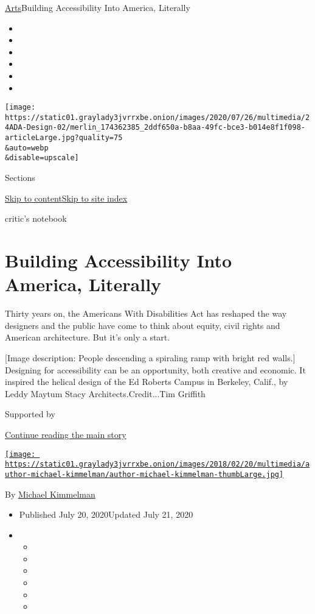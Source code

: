 \href{/section/arts}{Arts}\textbar{}Building Accessibility Into America,
Literally

\begin{itemize}
\item
\item
\item
\item
\item
\item
\end{itemize}

\texttt{[image: https://static01.graylady3jvrrxbe.onion/images/2020/07/26/multimedia/24ADA-Design-02/merlin\_174362385\_2ddf650a-b8aa-49fc-bce3-b014e8f1f098-articleLarge.jpg?quality=75\\\&auto=webp\\\&disable=upscale]}

Sections

\protect\hyperlink{site-content}{Skip to
content}\protect\hyperlink{site-index}{Skip to site index}

critic's notebook

\hypertarget{building-accessibility-into-america-literally}{%
\section{Building Accessibility Into America,
Literally}\label{building-accessibility-into-america-literally}}

Thirty years on, the Americans With Disabilities Act has reshaped the
way designers and the public have come to think about equity, civil
rights and American architecture. But it's only a start.

{[}Image description: People descending a spiraling ramp with bright red
walls.{]} Designing for accessibility can be an opportunity, both
creative and economic. It inspired the helical design of the Ed Roberts
Campus in Berkeley, Calif., by Leddy Maytum Stacy
Architects.Credit...Tim Griffith

Supported by

\protect\hyperlink{after-sponsor}{Continue reading the main story}

\href{https://www.nytimes3xbfgragh.onion/by/michael-kimmelman}{\texttt{[image: https://static01.graylady3jvrrxbe.onion/images/2018/02/20/multimedia/author-michael-kimmelman/author-michael-kimmelman-thumbLarge.jpg]}}

By
\href{https://www.nytimes3xbfgragh.onion/by/michael-kimmelman}{Michael
Kimmelman}

\begin{itemize}
\item
  Published July 20, 2020Updated July 21, 2020
\item
  \begin{itemize}
  \item
  \item
  \item
  \item
  \item
  \item
  \end{itemize}
\end{itemize}

